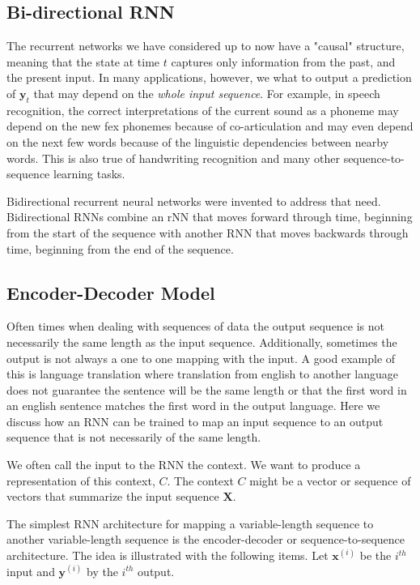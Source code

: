 \documentclass[12pt]{article}
\begin{document}
        \subsection{Bi-directional RNN}
            The recurrent networks we have considered up to now have a "causal" structure, meaning that the state at
            time $t$ captures only information from the past, and the present input. In many applications, however, we
            what to output a prediction of $\boldsymbol{y}_t$ that may depend on the \textit{whole input sequence}. For
            example, in speech recognition, the correct interpretations of the current sound as a phoneme may depend on
            the new fex phonemes because of co-articulation and may even depend on the next few words because of the
            linguistic dependencies between nearby words. This is also true of handwriting recognition and many other
            sequence-to-sequence learning tasks.

            Bidirectional recurrent neural networks were invented to address that need. Bidirectional RNNs combine an
            rNN that moves forward through time, beginning from the start of the sequence with another RNN that moves
            backwards through time, beginning from the end of the sequence. 
            
    \subsection{Encoder-Decoder Model}
        Often times when dealing with sequences of data the output sequence is not necessarily the same length as the
        input sequence. Additionally, sometimes the output is not always a one to one mapping with the input. A good
        example of this is language translation where translation from english to another language does not guarantee
        the sentence will be the same length or that the first word in an english sentence matches the first word in the
        output language. Here we discuss how an RNN can be trained to map an input sequence to an output sequence that
        is not necessarily of the same length.

        We often call the input to the RNN the context. We want to produce a representation of this context, $C$. The
        context $C$ might be a vector or sequence of vectors that summarize the input sequence $\boldsymbol{X}$.

        The simplest RNN architecture for mapping a variable-length sequence to another variable-length sequence is the
        encoder-decoder or sequence-to-sequence architecture. The idea is illustrated with the following items. Let
        $\boldsymbol{x}^{(i)}$ be the $i^{th}$ input and $\boldsymbol{y}^{(i)}$ by the $i^{th}$ output.
\end{document}
